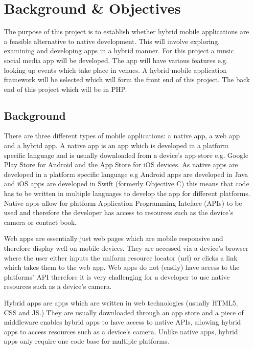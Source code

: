 \chapter{Background \& Objectives}

The purpose of this project is to establish whether hybrid mobile applications are a feasible alternative to native development. This will involve exploring, examining and developing apps in a hybrid manner. For this project a music social media app will be developed. The app will have various features e.g. looking up events which take place in  venues. A hybrid mobile application framework will be selected which will form the front end of this project. The back end of this project which will be in PHP.

\section{Background}
There are three different types of mobile applications: a native app, a web app and a hybrid app. A native app is an app which is developed in a platform specific language and is usually downloaded from a device's app store e.g. Google Play Store for Android and the App Store for iOS devices. As  native apps are developed in a platform specific language e.g Android apps are developed in Java and iOS apps are developed in Swift (formerly Objective C) this means that  code has to be written in multiple languages to develop the app for different platforms. Native apps allow for platform Application Programming Inteface (APIs) to be used and therefore the developer has access to resources such as the device's camera or contact book. 

Web apps are essentially just web pages which are mobile responsive and therefore display well on mobile devices. They are accessed via a device's browser where the user either inputs the uniform resource locator (url) or clicks a link which takes them to the web app. Web apps do not (easily) have access to the platforms' API therefore it is very challenging for a developer to use native resources such as a device's camera. 

Hybrid apps are apps which are written in web technologies (usually HTML5, CSS and JS.) They are usually downloaded through an app store and a piece of middleware enables hybrid apps to have access to native APIs, allowing hybrid apps to access resources such as a device's camera. Unlike native apps, hybrid apps only require one code base for multiple platforms.

